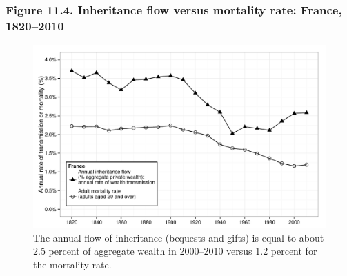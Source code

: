 \documentclass[t]{beamer}\usepackage[]{graphicx}\usepackage[]{color}
\newenvironment{knitrout}{}{} %
\begin{document}
\begin{frame}[label=Figure_11_4]
\frametitle{Figure 11.4. Inheritance flow versus mortality rate: France, 1820--2010}
\begin{figure}[t]
\begin{minipage}[b]{\textwidth}
\centering
\begin{knitrout}\footnotesize
{}\color{fgcolor}

{\centering \includegraphics[width=1\linewidth]{figures/bw/Figure_11_4} 

}



\end{knitrout}
\caption{The annual flow of inheritance (bequests and gifts) is equal to about 2.5 percent of aggregate wealth in 2000--2010 versus 1.2 percent for the mortality rate.}
\end{minipage}
\end{figure}
\end{frame}
\end{document}
